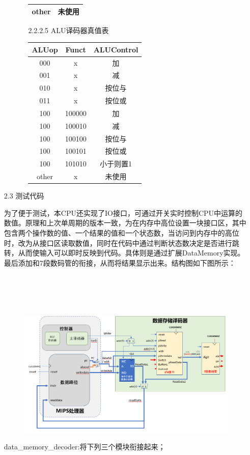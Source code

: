 \documentclass[UTF8]{article}
\begin{document}
\begin{enumerate}
\begin{enumerate}
\begin{enumerate}
\begin{tabular}{|c|c|}
								other & 未使用        \\ \hline 
							\end{tabular}
						\item [2.2.2.5] ALU译码器真值表\\
							\begin{tabular}{|c|c|c|} \hline
								ALUop & Funct  & ALUControl\\ \hline 
								000   & x      & 加        \\ \hline 
								001   & x      & 减        \\ \hline 
								010   & x      & 按位与    \\ \hline 
								011   & x      & 按位或    \\ \hline 
								100   & 100000 & 加        \\ \hline 
								100   & 100010 & 减        \\ \hline 
								100   & 100100 & 按位与    \\ \hline 
								100   & 100101 & 按位或    \\ \hline 
								100   & 101010 & 小于则置1 \\ \hline 
								other & x      & 未使用    \\ \hline 
							\end{tabular}
					\end{enumerate}
			\end{enumerate}
		\item [2.3] 测试代码
			\par 为了便于测试，本CPU还实现了IO接口，可通过开关实时控制CPU中运算的数值。原理和上次单周期的版本一致，为在内存中高位设置一块接口区，其中包含两个操作数的值、一个结果的值和一个状态数，当访问到内存中的高位时，改为从接口区读取数值，同时在代码中通过判断状态数决定是否进行跳转，从而使输入可以即时反映到代码。具体则是通过扩展DataMemory实现。最后添加和7段数码管的衔接，从而将结果显示出来。结构图如下图所示：\\\\\\\\\\
			
			\begin{figure}[htbp]
				\centering
				\includegraphics[scale=0.4]{2-3.png}
			\end{figure}
			data\_memory\_decoder:将下列三个模块衔接起来；
			

\end{enumerate}
\end{document}
